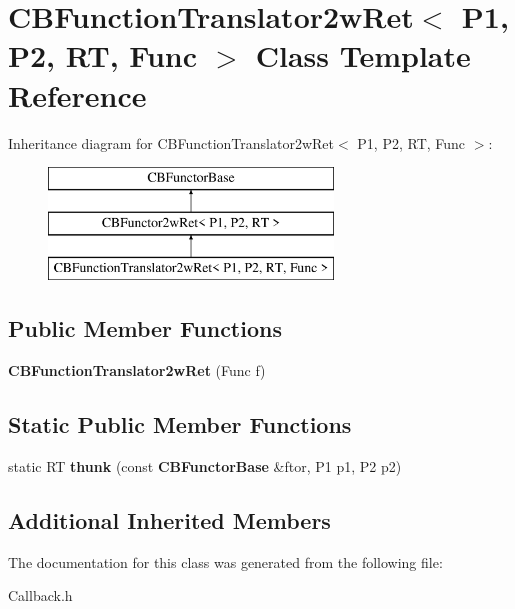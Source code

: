 \section{C\+B\+Function\+Translator2w\+Ret$<$ P1, P2, RT, Func $>$ Class Template Reference}
\label{classCBFunctionTranslator2wRet}
Inheritance diagram for C\+B\+Function\+Translator2w\+Ret$<$ P1, P2, RT, Func $>$\+:\begin{figure}[H]
\begin{center}
\leavevmode
\includegraphics[height=3.000000cm]{classCBFunctionTranslator2wRet}
\end{center}
\end{figure}
\subsection*{Public Member Functions}
\begin{DoxyCompactItemize}
\item 
{\bfseries C\+B\+Function\+Translator2w\+Ret} (Func f)\label{classCBFunctionTranslator2wRet_ae3bc8f17074bb2229c7fcdff0ac43cd2}

\end{DoxyCompactItemize}
\subsection*{Static Public Member Functions}
\begin{DoxyCompactItemize}
\item 
static RT {\bfseries thunk} (const {\bf C\+B\+Functor\+Base} \&ftor, P1 p1, P2 p2)\label{classCBFunctionTranslator2wRet_adcb4d97648e50b15dd26f03646d20374}

\end{DoxyCompactItemize}
\subsection*{Additional Inherited Members}


The documentation for this class was generated from the following file\+:\begin{DoxyCompactItemize}
\item 
Callback.\+h\end{DoxyCompactItemize}
